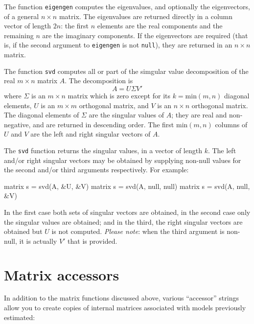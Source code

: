 The function \texttt{eigengen} computes the eigenvalues, and
optionally the eigenvectors, of a general $n \times n$ matrix.  The
eigenvalues are returned directly in a column vector of length $2n$:
the first $n$ elements are the real components and the remaining $n$
are the imaginary components.  If the eigenvectors are required (that
is, if the second argument to \texttt{eigengen} is not \texttt{null}),
they are returned in an $n \times n$ matrix.

The function \texttt{svd} computes all or part of the simgular value
decomposition of the real $m \times n$ matrix $A$.  The decomposition
is
\[
A = U \Sigma V'
\]
where $\Sigma$ is an $m \times n$ matrix which is zero except for its
$k = \mbox{min}(m, n)$ diagonal elements, $U$ is an $m \times m$
orthogonal matrix, and $V$ is an $n \times n$ orthogonal matrix.  The
diagonal elements of $\Sigma$ are the singular values of $A$; they are
real and non-negative, and are returned in descending order.  The
first $\mbox{min}(m, n)$ columns of $U$ and $V$ are the left and right
singular vectors of $A$.

The \texttt{svd} function returns the singular values, in a vector of
length $k$.  The left and/or right singular vectors may be obtained by
supplying non-null values for the second and/or third arguments
respectively.  For example:
%
\begin{code}
matrix s = svd(A, &U, &V)
matrix s = svd(A, null, null)
matrix s = svd(A, null, &V)
\end{code}
%
In the first case both sets of singular vectors are obtained, in the
second case only the singular values are obtained; and in the third,
the right singular vectors are obtained but $U$ is not computed.
\emph{Please note}: when the third argument is non-null, it is
actually $V'$ that is provided.


\section{Matrix accessors}
\label{matrix-accessors}

In addition to the matrix functions discussed above,
various ``accessor'' strings allow you to create copies of internal
matrices associated with models previously estimated:

